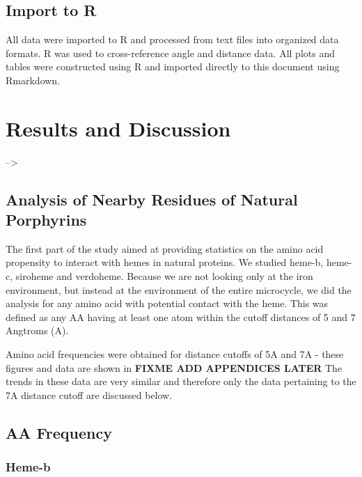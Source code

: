 \documentclass[a4paper, nobind]{templates/ociamthesis}
\begin{document}
\hypertarget{import-to-r}{%
\section{Import to R}\label{import-to-r}}

All data were imported to R and processed from text files into organized data formats. R was used to cross-reference angle and distance data. All plots and tables were constructed using R and imported directly to this document using Rmarkdown.

\adjustmtc
{}

\adjustmtc
{}

\hypertarget{discussion}{%
\chapter{Results and Discussion}\label{discussion}}

\minitoc

--\textgreater{}

\hypertarget{analysis-of-nearby-residues-of-natural-porphyrins}{%
\section{Analysis of Nearby Residues of Natural Porphyrins}\label{analysis-of-nearby-residues-of-natural-porphyrins}}

The first part of the study aimed at providing statistics on the amino acid propensity to interact with hemes in natural proteins. We studied heme-b, heme-c, siroheme and verdoheme. Because we are not looking only at the iron environment, but instead at the environment of the entire microcycle, we did the analysis for any amino acid with potential contact with the heme. This was defined as any AA having at least one atom within the cutoff distances of 5 and 7 Angtroms (A).

Amino acid frequencies were obtained for distance cutoffs of 5A and 7A - these figures and data are shown in \textbf{FIXME ADD APPENDICES LATER} The trends in these data are very similar and therefore only the data pertaining to the 7A distance cutoff are discussed below.

\hypertarget{disc-aaFreq}{%
\section{AA Frequency}\label{disc-aaFreq}}

\hypertarget{heme-b}{%
\subsection{Heme-b}\label{heme-b}}
\end{document}
